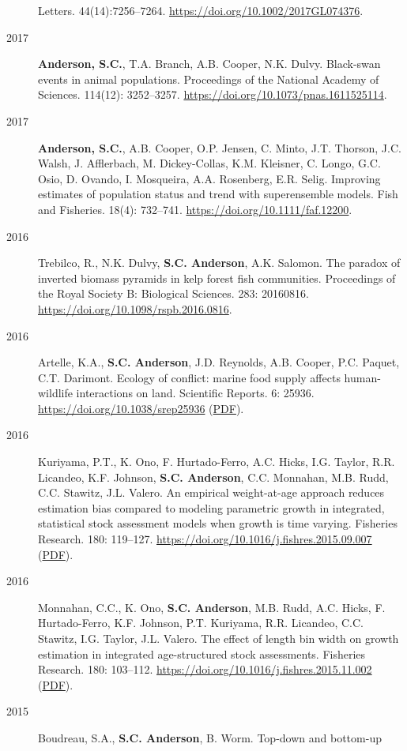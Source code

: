 \begin{description}
Letters. 44(14):7256--7264. \url{https://doi.org/10.1002/2017GL074376}.
\item[2017]
\textbf{Anderson, S.C.}, T.A. Branch, A.B. Cooper, N.K. Dulvy.
Black-swan events in animal populations. Proceedings of the National
Academy of Sciences. 114(12): 3252--3257.
\url{https://doi.org/10.1073/pnas.1611525114}.
\item[2017]
\textbf{Anderson, S.C.}, A.B. Cooper, O.P. Jensen, C. Minto, J.T.
Thorson, J.C. Walsh, J. Afflerbach, M. Dickey-Collas, K.M. Kleisner, C.
Longo, G.C. Osio, D. Ovando, I. Mosqueira, A.A. Rosenberg, E.R. Selig.
Improving estimates of population status and trend with superensemble
models. Fish and Fisheries. 18(4): 732--741.
\url{https://doi.org/10.1111/faf.12200}.
\item[2016]
Trebilco, R., N.K. Dulvy, \textbf{S.C. Anderson}, A.K. Salomon. The
paradox of inverted biomass pyramids in kelp forest fish communities.
Proceedings of the Royal Society B: Biological Sciences. 283: 20160816.
\url{https://doi.org/10.1098/rspb.2016.0816}.
\item[2016]
Artelle, K.A., \textbf{S.C. Anderson}, J.D. Reynolds, A.B. Cooper, P.C.
Paquet, C.T. Darimont. Ecology of conflict: marine food supply affects
human-wildlife interactions on land. Scientific Reports. 6: 25936.
\url{https://doi.org/10.1038/srep25936}
(\href{http://www.nature.com/articles/srep25936.pdf}{PDF}).
\item[2016]
Kuriyama, P.T., K. Ono, F. Hurtado-Ferro, A.C. Hicks, I.G. Taylor, R.R.
Licandeo, K.F. Johnson, \textbf{S.C. Anderson}, C.C. Monnahan, M.B.
Rudd, C.C. Stawitz, J.L. Valero. An empirical weight-at-age approach
reduces estimation bias compared to modeling parametric growth in
integrated, statistical stock assessment models when growth is time
varying. Fisheries Research. 180: 119--127.
\url{https://doi.org/10.1016/j.fishres.2015.09.007}
(\href{https://www.dropbox.com/s/425a18a4xm9kq8l/Kuriyama_etal_2016_empirical.pdf?dl=1}{PDF}).
\item[2016]
Monnahan, C.C., K. Ono, \textbf{S.C. Anderson}, M.B. Rudd, A.C. Hicks,
F. Hurtado-Ferro, K.F. Johnson, P.T. Kuriyama, R.R. Licandeo, C.C.
Stawitz, I.G. Taylor, J.L. Valero. The effect of length bin width on
growth estimation in integrated age-structured stock assessments.
Fisheries Research. 180: 103--112.
\url{https://doi.org/10.1016/j.fishres.2015.11.002}
(\href{https://www.dropbox.com/s/uksmdtptby9w0ku/Monnahan_etal_2016_binwidth.pdf?dl=1}{PDF}).
\item[2015]
Boudreau, S.A., \textbf{S.C. Anderson}, B. Worm. Top-down and bottom-up

\end{description}
